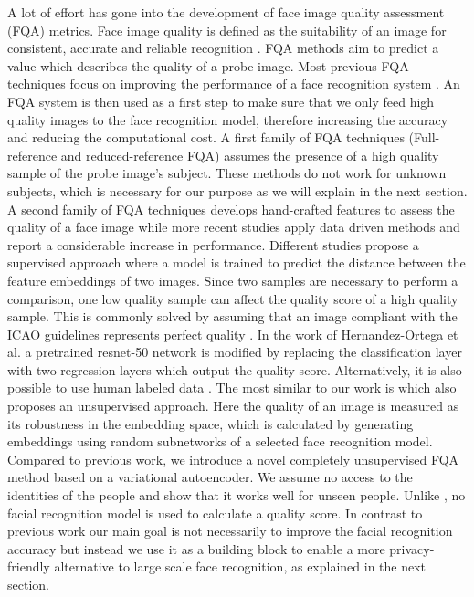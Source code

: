 \documentclass[letterpaper]{article} %
\begin{document}
A lot of effort has gone into the development of face image quality assessment (FQA) metrics. Face image quality is defined as the suitability of an image for consistent, accurate and reliable recognition \cite{hernandez2020biometric}. FQA methods aim to predict a value which describes the quality of a probe image. Most previous FQA techniques focus on improving the performance of a face recognition system \cite{wong_cvprw_2011, anantharajah2012quality, qi2018boosting, vignesh2015face, best2017automatic, hernandez2020biometric, terhorst2020ser}. An FQA system is then used as a first step to make sure that we only feed high quality images to the face recognition model, therefore increasing the accuracy and reducing the computational cost. A first family of FQA techniques (Full-reference and reduced-reference FQA) assumes the presence of a high quality sample of the probe image's subject. These methods do not work for unknown subjects, which is necessary for our purpose as we will explain in the next section. A second family of FQA techniques develops hand-crafted features to assess the quality of a face image \cite{anantharajah2012quality, REFICAO} while more recent studies apply data driven methods and report a considerable increase in performance. Different studies \cite{qi2018boosting, vignesh2015face} propose a supervised approach where a model is trained to predict the distance between the feature embeddings of two images. Since two samples are necessary to perform a comparison, one low quality sample can affect the quality score of a high quality sample. This is commonly solved by assuming that an image compliant with the ICAO guidelines \cite{REFICAO} represents perfect quality \cite{hernandez2020biometric}. In the work of Hernandez-Ortega et al. a pretrained resnet-50 network \cite{he2016deep} is modified by replacing the classification layer with two regression layers which output the quality score. Alternatively, it is also possible to use human labeled data \cite{best2017automatic}. The most similar to our work is \cite{terhorst2020ser} which also proposes an unsupervised approach. Here the quality of an image is measured as its robustness in the embedding space, which is calculated by generating embeddings using random subnetworks of a selected face recognition model.
\\
\newline
Compared to previous work, we introduce a novel completely unsupervised FQA method based on a variational autoencoder. We assume no access to the identities of the people and show that it works well for unseen people. Unlike \cite{terhorst2020ser}, no facial recognition model is used to calculate a quality score. In contrast to previous work our main goal is not necessarily to improve the facial recognition accuracy but instead we use it as a building block to enable a more privacy-friendly alternative to large scale face recognition, as explained in the next section.
\end{document}
